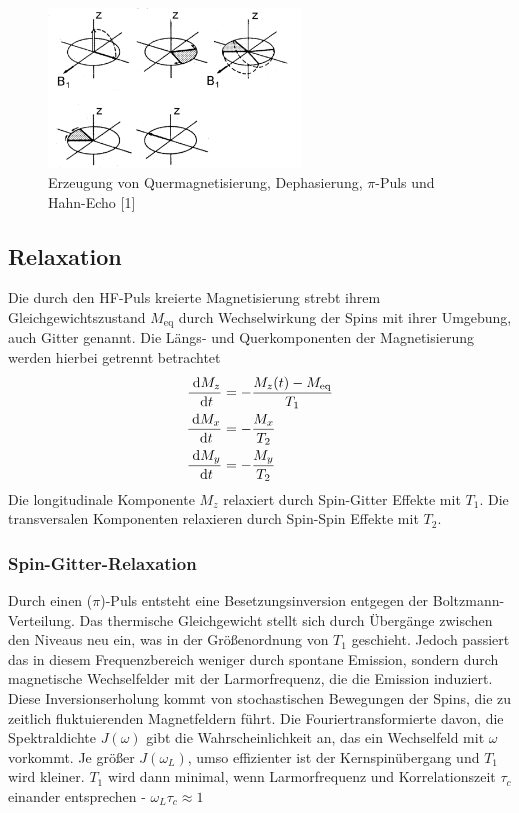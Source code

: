 \begin{figure}[t]
 \includegraphics[width=0.6\textwidth]{../pics/rephasierung.jpg}
 \caption{Erzeugung von Quermagnetisierung, Dephasierung, $\pi$-Puls und Hahn-Echo [1]}
 \label{pic_rephasierung}
\end{figure}

\subsection{Relaxation}
Die durch den HF-Puls kreierte Magnetisierung strebt ihrem Gleichgewichtszustand $M_\text{eq}$ durch Wechselwirkung der Spins mit ihrer Umgebung, auch
Gitter genannt. Die Längs- und Querkomponenten der Magnetisierung werden hierbei getrennt betrachtet
\begin{align}
 \frac{\; \mathrm{d} M_z}{\; \mathrm{d} t} &= -\frac{M_z(t) - M_\text{eq}}{T_1}\\
 \frac{\; \mathrm{d} M_x}{\; \mathrm{d} t} &= -\frac{M_x}{T_2}\\
 \frac{\; \mathrm{d} M_y}{\; \mathrm{d} t} &= -\frac{M_y}{T_2}
\end{align}
\noindent
Die longitudinale Komponente $M_z$ relaxiert durch Spin-Gitter Effekte mit $T_1$. Die transversalen Komponenten relaxieren durch Spin-Spin Effekte mit
$T_2$.

\subsubsection{Spin-Gitter-Relaxation}
Durch einen ($\pi$)-Puls entsteht eine Besetzungsinversion entgegen der Boltzmann-Verteilung. Das thermische Gleichgewicht stellt sich durch Übergänge zwischen
den Niveaus neu ein, was in der Größenordnung von $T_1$ geschieht. Jedoch passiert das in diesem Frequenzbereich weniger durch spontane Emission, sondern durch 
magnetische Wechselfelder mit der Larmorfrequenz, die die Emission induziert. Diese Inversionserholung kommt von stochastischen Bewegungen
der Spins, die zu zeitlich fluktuierenden Magnetfeldern führt. Die Fouriertransformierte davon, die Spektraldichte $J(\omega)$ gibt die Wahrscheinlichkeit an,
das ein Wechselfeld mit $\omega$ vorkommt. Je größer $J(\omega_L)$, umso effizienter ist der Kernspinübergang und $T_1$ wird kleiner. $T_1$ wird dann minimal, 
wenn Larmorfrequenz und Korrelationszeit $\tau_c$ einander entsprechen - $\omega_L \tau_c \approx 1$

